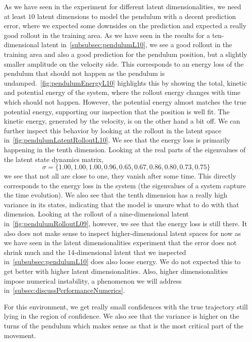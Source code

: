 		As we have seen in the experiment for different latent dimensionalities, we need at least \(10\) latent dimensions to model the pendulum with a decent prediction error, where we expected some downsides on the prediction and expected a really good rollout in the training area. As we have seen in the results for a ten-dimensional latent in~\autoref{subsubsec:pendulumL10}, we see a good rollout in the training area and also a good prediction for the pendulum position, but a slightly smaller amplitude on the velocity side. This corresponds to an energy loss of the pendulum that should not happen as the pendulum is undamped.~\autoref{fig:pendulumEnergyL10} highlights this by showing the total, kinetic and potential energy of the system, where the rollout energy changes with time which should not happen. However, the potential energy almost matches the true potential energy, supporting our inspection that the position is well fit. The kinetic energy, generated by the velocity, is on the other hand a bit off. We can further inspect this behavior by looking at the rollout in the latent space in~\autoref{fig:pendulumLatentRolloutL10}. We see that the energy loss is primarily happening in the tenth dimension. Looking at the real parts of the eigenvalues of the latent state dynamics matrix,
		\begin{equation*}
			\sigma = \{ 1.00, 1.00, 1.00, 0.96, 0.65, 0.67, 0.86, 0.80, 0.73, 0.75 \}
		\end{equation*}
		we see that not all are close to one, \ie they vanish after some time. This directly corresponds to the energy loss in the system (the eigenvalues of a system capture the time evolution). We also see that the tenth dimension has a really high variance in its states, indicating that the model is unsure what to do with that dimension. Looking at the rollout of a nine-dimensional latent in~\autoref{fig:pendulumRolloutL09}, however, we see that the energy loss is still there. It also does not make sense to inspect higher-dimensional latent spaces for now as we have seen in the latent dimensionalities experiment that the error does not shrink much and the 14-dimensional latent that we inspected in~\autoref{subsubsec:pendulumL10} does also loose energy. We do not expected this to get better with higher latent dimensionalities. Also, higher dimensionalities impose numerical instability, a phenomenon we will address in~\autoref{subsec:discussPerformanceNumerics}.

		For this environment, we get really small confidences with the true trajectory still lying in the region of confidence. We also see that the variance is higher on the turns of the pendulum which makes sense as that is the most critical part of the movement.


